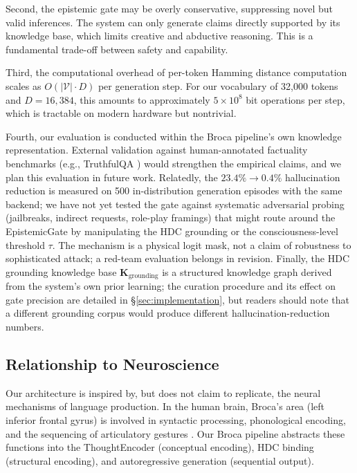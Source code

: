 \documentclass[12pt,a4paper]{article}
\begin{document}
Second, the epistemic gate may be overly conservative, suppressing novel but valid inferences. The system can only generate claims directly supported by its knowledge base, which limits creative and abductive reasoning. This is a fundamental trade-off between safety and capability.

Third, the computational overhead of per-token Hamming distance computation scales as $O(|\mathcal{V}| \cdot D)$ per generation step. For our vocabulary of 32,000 tokens and $D = 16{,}384$, this amounts to approximately $5 \times 10^8$ bit operations per step, which is tractable on modern hardware but nontrivial.

Fourth, our evaluation is conducted within the Broca pipeline's own knowledge representation. External validation against human-annotated factuality benchmarks (e.g., TruthfulQA \citep{lin2022truthfulqa}) would strengthen the empirical claims, and we plan this evaluation in future work. Relatedly, the $23.4\% \rightarrow 0.4\%$ hallucination reduction is measured on 500 in-distribution generation episodes with the same backend; we have not yet tested the gate against systematic adversarial probing (jailbreaks, indirect requests, role-play framings) that might route around the EpistemicGate by manipulating the HDC grounding or the consciousness-level threshold $\tau$. The mechanism is a physical logit mask, not a claim of robustness to sophisticated attack; a red-team evaluation belongs in revision. Finally, the HDC grounding knowledge base $\mathbf{K}_{\text{grounding}}$ is a structured knowledge graph derived from the system's own prior learning; the curation procedure and its effect on gate precision are detailed in \S\ref{sec:implementation}, but readers should note that a different grounding corpus would produce different hallucination-reduction numbers.

\subsection{Relationship to Neuroscience}

Our architecture is inspired by, but does not claim to replicate, the neural mechanisms of language production. In the human brain, Broca's area (left inferior frontal gyrus) is involved in syntactic processing, phonological encoding, and the sequencing of articulatory gestures \citep{hagoort2005broca}. Our Broca pipeline abstracts these functions into the ThoughtEncoder (conceptual encoding), HDC binding (structural encoding), and autoregressive generation (sequential output).
\end{document}
